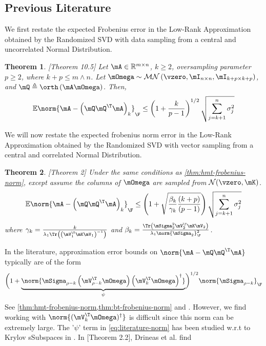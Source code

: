 \documentclass[10pt]{article}
\newcommand{\ccref}[1]{\textcolor{darkred}{\cref{#1}}}
\theoremstyle{plain}
\newtheorem{theorem}{Theorem}
\theoremstyle{definition}
\theoremstyle{remark}
\begin{document}
\subsection{Previous Literature}
We first restate the expected Frobenius error in the Low-Rank Approximation obtained by the Randomized SVD with data sampling from a central and uncorrelated Normal Distribution. 
\begin{theorem}\cite{halko:2011}[Theorem 10.5] \label{thm:halko-frobenius}
    Let $\mA \in \mathbb{R}^{m \times n}$, $k \geq 2$, oversampling parameter $p\geq 2$, where $k+p\leq m \land n$. Let $\mOmega \sim \mathcal{MN}\left(\vzero, \mI_{n\times n},\mI_{k+p\times k+p}\right)$, and $\mQ \triangleq \orth\left(\mA \mOmega\right)$.  Then,
    \begin{equation}
    	\mathbb{E}\norm{\mA - \left(\mQ\mQ^{\T}\mA\right)_k}_{\F} \leq \left(1 + \frac{k}{p-1}\right)^{1/2}\sqrt{\sum_{j=k+1}^n\sigma_j^2}
    \end{equation}
    \label{thm:hmt-frobenius-norm}
\end{theorem}
We will now restate the expected frobenius norm error in the Low-Rank Approximation obtained by the Randomized SVD with vector sampling from a central and correlated Normal Distribution.
\begin{theorem}\cite{boulle:2022}[Theorem 2]
	Under the same conditions as \ccref{thm:hmt-frobenius-norm}, except assume the columns of $\mOmega$ are sampled from $\mathcal{N}(\vzero,\mK)$. 
	\begin{equation}
		\mathbb{E}\norm{\mA - \left(\mQ\mQ^{\T} \mA\right)_k}_{\F}\leq \left(1 + \sqrt{\frac{\beta_k}{\gamma_k}\frac{(k+p)}{(p-1)}}\right)\sqrt{\sum_{j=k+1}^n\sigma_j^2}
	\end{equation}
	where $\gamma_k = \frac{k}{\lambda_1 \Tr\left(\left(\mV_1^{\T}\mK\mV_1\right)^{-1}\right)}$ and $ \beta_k = \frac{\Tr\left(\mSigma_2^2 \mV_2^{\T}\mK\mV_2\right)}{\lambda_1\norm{\mSigma_2}^{2}_{\F}}$.
	\label{thm:bt-frobenius-norm}
\end{theorem}
In the literature, approximation error bounds on $\norm{\mA - \mQ\mQ^{\T}\mA}$ typically are of the form 
\begin{equation}
	\biggl(1 + \underbrace{\norm{\mSigma_{\rho-k}\left(\mV_{\rho-k}^{\T}\mOmega\right)\left(\mV_{k}^{\T}\mOmega\right)^{\dagger}}}_{\psi}\biggr)^{1/2}\norm{\mSigma_{\rho-k}}_{\F} \label{eq:literature-norm}
\end{equation} See \ccref{thm:hmt-frobenius-norm,thm:bt-frobenius-norm} and \cite{boutsidis:2013,gittens:2013}. However, we find working with $\norm{(\mV_{k}^{\T}\mOmega)^{\dagger}}$ is difficult since this norm can be extremely large. The '$\psi$' term in \ccref{eq:literature-norm} has been studied w.r.t to Krylov sSubspaces in \cite{drineas:2018}. In \cite{drineas:2018}[Theorem 2.2], Drineas et al. find
\end{document}
